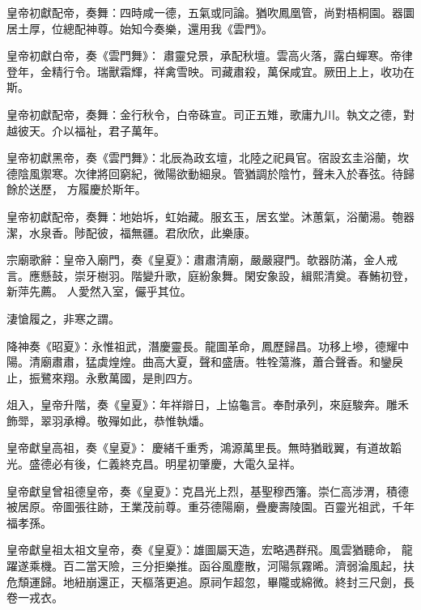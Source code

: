 \begin{pinyinscope}
 皇帝初獻配帝，奏舞：四時咸一德，五氣或同論。猶吹鳳凰管，尚對梧桐園。器圜居土厚，位總配神尊。始知今奏樂，還用我《雲門》。



 皇帝初獻白帝，奏《雲門舞》：
 肅靈兌景，承配秋壇。雲高火落，露白蟬寒。帝律登年，金精行令。瑞獸霜輝，祥禽雪映。司藏肅殺，萬保咸宜。厥田上上，收功在斯。



 皇帝初獻配帝，奏舞：金行秋令，白帝硃宣。司正五雉，歌庸九川。執文之德，對越彼天。介以福祉，君子萬年。



 皇帝初獻黑帝，奏《雲門舞》：北辰為政玄壇，北陸之祀員官。宿設玄圭浴蘭，坎德陰風禦寒。次律將回窮紀，微陽欲動細泉。管猶調於陰竹，聲未入於春弦。待歸餘於送歷，
 方履慶於斯年。



 皇帝初獻配帝，奏舞：地始坼，虹始藏。服玄玉，居玄堂。沐蕙氣，浴蘭湯。匏器潔，水泉香。陟配彼，福無疆。君欣欣，此樂康。



 宗廟歌辭：皇帝入廟門，奏《皇夏》：肅肅清廟，嚴嚴寢門。欹器防滿，金人戒言。應懸鼓，崇牙樹羽。階變升歌，庭紛象舞。閑安象設，緝熙清奠。春鮪初登，新萍先薦。
 人愛然入室，儼乎其位。



 淒愴履之，非寒之謂。



 降神奏《昭夏》：永惟祖武，潛慶靈長。龍圖革命，鳳歷歸昌。功移上墋，德耀中陽。清廟肅肅，猛虡煌煌。曲高大夏，聲和盛唐。牲牷蕩滌，蕭合聲香。和鑾戾止，振鷺來翔。永敷萬國，是則四方。



 俎入，皇帝升階，奏《皇夏》：年祥辯日，上協龜言。奉酎承列，來庭駿奔。雕禾飾斝，翠羽承樽。敬殫如此，恭惟執燔。



 皇帝獻皇高祖，奏《皇夏》：
 慶緒千重秀，鴻源萬里長。無時猶戢翼，有道故韜光。盛德必有後，仁義終克昌。明星初肇慶，大電久呈祥。



 皇帝獻皇曾祖德皇帝，奏《皇夏》：克昌光上烈，基聖穆西籓。崇仁高涉渭，積德被居原。帝圖張往跡，王業茂前尊。重芬德陽廟，疊慶壽陵園。百靈光祖武，千年福孝孫。



 皇帝獻皇祖太祖文皇帝，奏《皇夏》：雄圖屬天造，宏略遇群飛。風雲猶聽命，
 龍躍遂乘機。百二當天險，三分拒樂推。函谷風塵散，河陽氛霧晞。濟弱淪風起，扶危頹運歸。地紐崩還正，天樞落更追。原祠乍超忽，畢隴或綿微。終封三尺劍，長卷一戎衣。




\end{pinyinscope}
